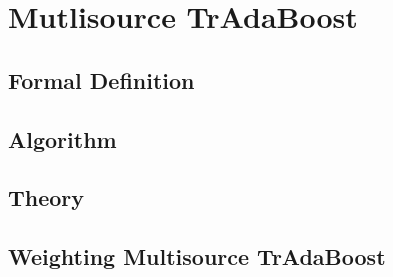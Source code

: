 \documentclass[12pt]{article}
\begin{document}
    \section{Mutlisource TrAdaBoost} \label{boost-multisource}

      \subsection{Formal Definition} \label{boost-multi-def}

      \subsection{Algorithm} \label{boost-multi-algo}

      \subsection{Theory} \label{boost-multi-theory}

      \subsection{Weighting Multisource TrAdaBoost} \label{boost-multisource-weight}
      
    \printbibliography
\end{document}
